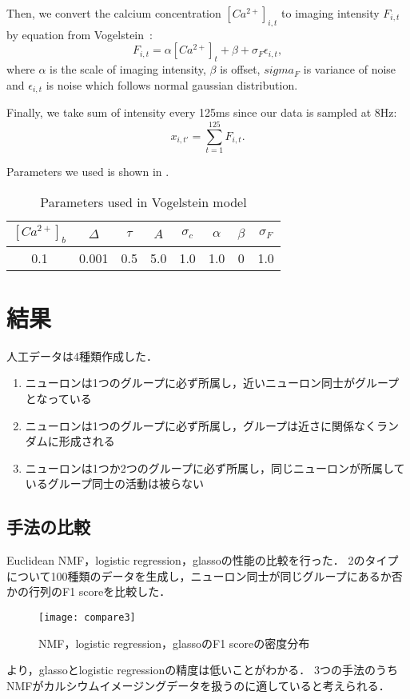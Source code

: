 Then, we convert the calcium concentration $[Ca^{2+}]_{i,t}$ to imaging intensity $F_{i,t}$ by equation from Vogelstein~\cite{Vogelstein2009}:
\begin{equation}
  F_{i,t} = \alpha[Ca^{2+}]_t + \beta + \sigma_F \epsilon_{i,t},
  \label{eq:intensity}
\end{equation}
where $\alpha$ is the scale of imaging intensity, $\beta$ is offset, $sigma_F$ is variance of noise and $\epsilon_{i,t}$ is noise which follows normal gaussian distribution.

Finally, we take sum of intensity every 125ms since our data is sampled at 8Hz:
\begin{equation}
  x_{i,t'} = \sum_{t=1}^{125} F_{i,t}.
  \label{eq:observation}
\end{equation}

Parameters we used is shown in .
\begin{table}[htb]
  \center
  \begin{tabular}{|cccccccc|} \hline
    $[Ca^{2+}]_b$ & $\Delta$ & $\tau$ & $A$ & $\sigma_c$ & $\alpha$ & $\beta$ & $\sigma_F$ \\ \hline
    0.1 & 0.001 & 0.5 & 5.0 & 1.0 & 1.0 & 0 & 1.0 \\ \hline
  \end{tabular}
  \caption{Parameters used in Vogelstein model}
  \label{tab:parameter2}
\end{table}

\section{結果}
人工データは4種類作成した．
\begin{enumerate}
  \item ニューロンは1つのグループに必ず所属し，近いニューロン同士がグループとなっている
  \item ニューロンは1つのグループに必ず所属し，グループは近さに関係なくランダムに形成される
  \item ニューロンは1つか2つのグループに必ず所属し，同じニューロンが所属しているグループ同士の活動は被らない
\end{enumerate}

\subsection{手法の比較}
Euclidean NMF，logistic regression，glassoの性能の比較を行った．
2のタイプについて100種類のデータを生成し，ニューロン同士が同じグループにあるか否かの行列のF1 scoreを比較した．
\begin{figure}[htbp]
    \begin{center}
        \texttt{[image: compare3]}
        \caption{NMF，logistic regression，glassoのF1 scoreの密度分布}
        \label{fig:compare3}
    \end{center}
\end{figure}
より，glassoとlogistic regressionの精度は低いことがわかる．
3つの手法のうちNMFがカルシウムイメージングデータを扱うのに適していると考えられる．

